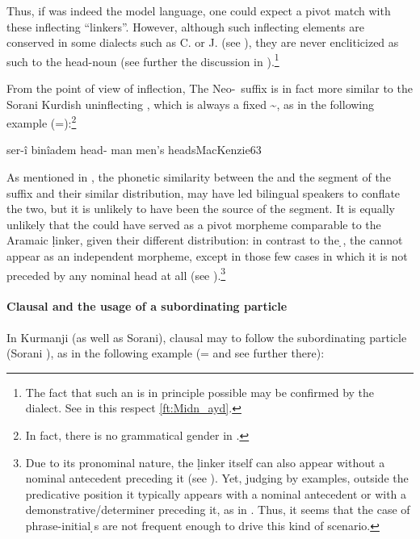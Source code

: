 Thus, if \Kur was indeed the model language, one could expect a pivot match with these inflecting \enquote{linkers}. However, although such inflecting elements are conserved in some  dialects such as C. \Barw or J. \Arb  (see ), they are never encliticized as such to the head-noun (see further the discussion in ).\footnote{The fact that such an  is in principle possible may be confirmed by the  \Midn dialect. See in this respect \vref{ft:Midn_ayd}.}

From the point of view of inflection, The  Neo-\cst\ suffix is in fact more similar to the Sorani Kurdish uninflecting \ez*, which is always a fixed \~, as in the following example (=):\footnote{In fact, there is no grammatical gender in \Sor.}

{ser-î binîadem}
{head-\ez{} man}
{men's heads}{MacKenzie}{63}

As mentioned in , the phonetic similarity between the \Sor \ez* and the  segment of the  \cst* suffix \ed  and their similar distribution, may have led bilingual speakers to conflate the two, but it is unlikely to have been the source of the   segment. It is equally unlikely that the \Sor \ez* could have served as a pivot morpheme comparable to the Aramaic \d linker, given their different distribution: in contrast to the \d \lnk*, the \Sor \ez*  cannot appear as an independent morpheme, except in those few cases in which it is not preceded by any nominal head at all (see ).\footnote{Due to its pronominal nature, the \d linker itself can also appear without a nominal antecedent preceding it (see ). Yet, judging by  examples, outside the predicative position it typically appears with a nominal antecedent or with a demonstrative/determiner preceding it, as in . Thus, it seems that the case of phrase-initial \d \lnk*s are not frequent enough to drive this kind of  scenario.}









 
 



\paragraph{Clausal \secns and the usage of a subordinating particle} \label{par:clausal_secn}
\largerpage[2]
In Kurmanji (as well as Sorani), clausal \secns may to follow the subordinating particle  (Sorani ), as in the following example (= and see further there): 

